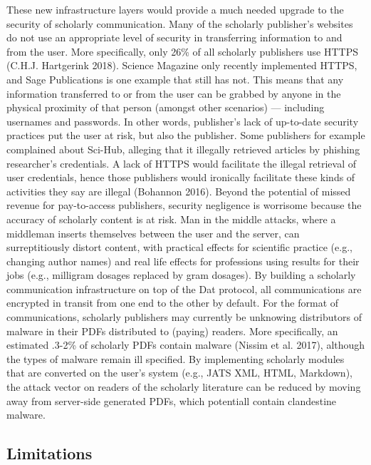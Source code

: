 \documentclass[a4paper]{article}
\begin{document}
These new infrastructure layers would provide a much needed upgrade to
the security of scholarly communication. Many of the scholarly
publisher's websites do not use an appropriate level of security in
transferring information to and from the user. More specifically, only
26\% of all scholarly publishers use HTTPS (C.H.J. Hartgerink 2018).
Science Magazine only recently implemented HTTPS, and Sage Publications
is one example that still has not. This means that any information
transferred to or from the user can be grabbed by anyone in the physical
proximity of that person (amongst other scenarios) --- including
usernames and passwords. In other words, publisher's lack of up-to-date
security practices put the user at risk, but also the publisher. Some
publishers for example complained about Sci-Hub, alleging that it
illegally retrieved articles by phishing researcher's credentials. A
lack of HTTPS would facilitate the illegal retrieval of user
credentials, hence those publishers would ironically facilitate these
kinds of activities they say are illegal (Bohannon 2016). Beyond the
potential of missed revenue for pay-to-access publishers, security
negligence is worrisome because the accuracy of scholarly content is at
risk. Man in the middle attacks, where a middleman inserts themselves
between the user and the server, can surreptitiously distort content,
with practical effects for scientific practice (e.g., changing author
names) and real life effects for professions using results for their
jobs (e.g., milligram dosages replaced by gram dosages). By building a
scholarly communication infrastructure on top of the Dat protocol, all
communications are encrypted in transit from one end to the other by
default. For the format of communications, scholarly publishers may
currently be unknowing distributors of malware in their PDFs distributed
to (paying) readers. More specifically, an estimated .3-2\% of scholarly
PDFs contain malware (Nissim et al. 2017), although the types of malware
remain ill specified. By implementing scholarly modules that are
converted on the user's system (e.g., JATS XML, HTML, Markdown), the
attack vector on readers of the scholarly literature can be reduced by
moving away from server-side generated PDFs, which potentiall contain
clandestine malware.

\hypertarget{limitations}{%
\subsection{Limitations}\label{limitations}}
\end{document}
